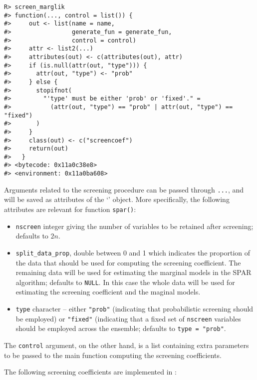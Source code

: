 \documentclass[
  article]{jss}
\newcommand{\class}[1]{`\code{#1}'}
\begin{document}
\begin{verbatim}
R> screen_marglik
#> function(..., control = list()) {
#>     out <- list(name = name,
#>                 generate_fun = generate_fun,
#>                 control = control)
#>     attr <- list2(...)
#>     attributes(out) <- c(attributes(out), attr)
#>     if (is.null(attr(out, "type"))) {
#>       attr(out, "type") <- "prob"
#>     } else {
#>       stopifnot(
#>         "'type' must be either 'prob' or 'fixed'." =
#>           (attr(out, "type") == "prob" | attr(out, "type") == "fixed")
#>       )
#>     }
#>     class(out) <- c("screencoef")
#>     return(out)
#>   }
#> <bytecode: 0x11a0c38e8>
#> <environment: 0x11a0ba608>
\end{verbatim}

Arguments related to the screening procedure can be passed through
\texttt{...}, and will be saved as attributes of the \class{screencoef}
object. More specifically, the following attributes are relevant for
function \texttt{spar()}:

\begin{itemize}
\item
  \texttt{nscreen} integer giving the number of variables to be retained
  after screening; defaults to \(2n\).
\item
  \texttt{split\_data\_prop}, double between 0 and 1 which indicates the
  proportion of the data that should be used for computing the screening
  coefficient. The remaining data will be used for estimating the
  marginal models in the SPAR algorithm; defaults to \texttt{NULL}. In
  this case the whole data will be used for estimating the screening
  coefficient and the maginal models.
\item
  \texttt{type} character -- either \texttt{"prob"} (indicating that
  probabilistic screening should be employed) or \texttt{"fixed"}
  (indicating that a fixed set of \texttt{nscreen} variables should be
  employed across the ensemble; defaults to \texttt{type\ =\ "prob"}.
\end{itemize}

The \texttt{control} argument, on the other hand, is a list containing
extra parameters to be passed to the main function computing the
screening coefficients.

The following screening coefficients are implemented in :
\end{document}
